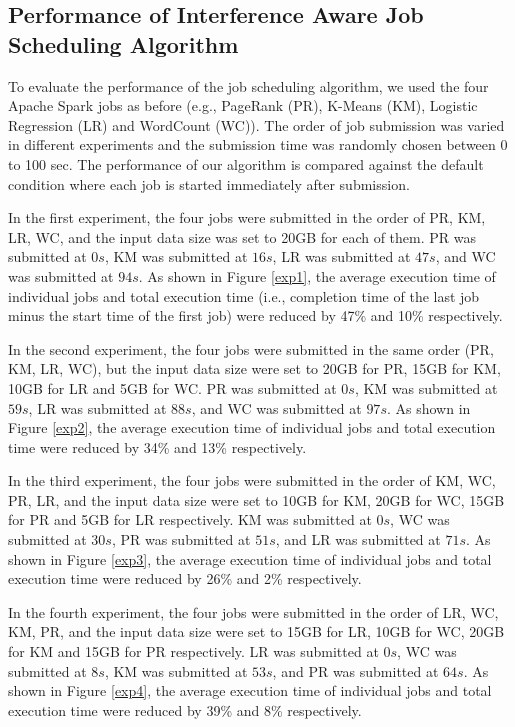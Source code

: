 \subsection{Performance of Interference Aware Job Scheduling Algorithm}


To evaluate the performance of the job scheduling algorithm, we used the four Apache Spark jobs as before (e.g., PageRank (PR), K-Means (KM), Logistic Regression (LR) and WordCount (WC)). The order of job submission was varied in different experiments and the submission time was randomly chosen between 0 to 100 sec. The performance of our algorithm is compared against the default condition where each job is started immediately after submission. 

\noindent
In the first experiment, the four jobs were submitted in the order of PR, KM, LR, WC, and the input data size was set to 20GB for each of them. PR was submitted at $0s$, KM was submitted at $16s$, LR was submitted at $47s$, and WC was submitted at $94s$. As shown in Figure \ref{exp1}, the average execution time of individual jobs and total execution time (i.e., completion time of the last job minus the start time of the first job) were reduced by 47\% and 10\% respectively. 



\noindent
In the second experiment, the four jobs were submitted in the same order (PR, KM, LR, WC), but the input data size were set to 20GB for PR, 15GB for KM, 10GB for LR and 5GB for WC. PR was submitted at $0s$, KM was submitted at $59s$, LR was submitted at $88s$, and WC was submitted at $97s$. As shown in Figure \ref{exp2}, the average execution time of individual jobs and total execution time were reduced by 34\% and 13\% respectively. 

\noindent
In the third experiment, the four jobs were submitted in the order of KM, WC, PR, LR, and the input data size were set to 10GB for KM, 20GB for WC, 15GB for PR and 5GB for LR respectively. KM was submitted at $0s$, WC was submitted at $30s$, PR was submitted at $51s$, and LR was submitted at $71s$. As shown in Figure \ref{exp3}, the average execution time of individual jobs and total execution time were reduced by 26\% and 2\% respectively. 

\noindent
In the fourth experiment, the four jobs were submitted in the order of LR, WC, KM, PR, and the input data size were set to 15GB for LR, 10GB for WC, 20GB for KM and 15GB for PR respectively. LR was submitted at $0s$, WC was submitted at $8s$, KM was submitted at $53s$, and PR was submitted at $64s$. As shown in Figure \ref{exp4}, the average execution time of individual jobs and total execution time were reduced by 39\% and 8\% respectively. 

